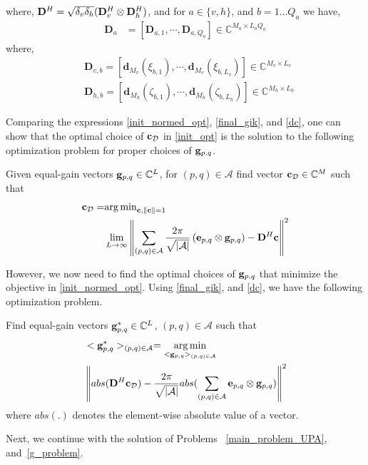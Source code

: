 \noindent where, ${\bf{D}}^H = \sqrt{\delta_v\delta_h}(\mathbf{D}_{v}^{H} \otimes \mathbf{D}_{h}^{H})$, and for $a \in \{v,h\}$, and $b= 1\ldots Q_a$ we have, 
\begin{align}
\mathbf{D}_{a} &=\left[\mathbf{D}_{a, 1}, \cdots, \mathbf{D}_{a, Q_{a}}\right] \in \mathbb{C}^{M_{a} \times L_{a} Q_{a}}
\end{align}
where, 
\begin{align}
    &\mathbf{D}_{v, b} =\left[\mathbf{d}_{M_{v}}\left(\xi_{b,1}\right), \cdots, \mathbf{d}_{M_{v}}\left(\xi_{b, L_v}\right)\right] \in \mathbb{C}^{M_{v} \times L_{v}} \\
    &\mathbf{D}_{h, b} =\left[\mathbf{d}_{M_{h}}\left(\zeta_{b,1}\right), \cdots, \mathbf{d}_{M_{h}}\left(\zeta_{b, L_h}\right)\right] \in \mathbb{C}^{M_{h} \times L_{h}}
\end{align}

Comparing the expressions \eqref{init_normed_opt}, \eqref{final_gik}, and \eqref{dc}, one can show that the optimal choice of ${\bf{c}}_\mathcal{D}$ in \eqref{init_opt} is the solution to the following optimization problem for proper choices of ${\bf{g}}_{p,q}$. 

\begin{problem}
Given equal-gain vectors ${\bf{g}}_{p,q} \in \mathbb{C}^L$, for $(p,q) \in \mathcal{A}$  find vector ${\bf{c}}_{\mathcal{D}} \in \mathbb{C}^{M}$ such that
\begin{align}
{\bf{c}}_{\mathcal{D}}=&{\arg \min }_{{\bf{c}}, \|{\bf{c}}\|=1}\nonumber\\& \lim_{L\rightarrow \infty} \left\|\sum_{(p,q) \in \mathcal{A}}\frac{2\pi}{\sqrt{|\mathcal{A}|}}\left(\mathbf{e}_{p,q} \otimes \mathbf{g}_{p,q}\right)- {\bf{D}}^H {\bf{c}}\right\|^{2} \label{obj_func}
\end{align}
\label{main_problem_UPA}
\end{problem}

However, we now need to find the optimal choices of ${\bf{g}}_{p,q}$ that minimize the objective in \eqref{init_normed_opt}. Using \eqref{final_gik}, and \eqref{dc}, we have the following optimization problem.

\begin{problem}
Find equal-gain vectors ${\bf{g}}^*_{p,q} \in \mathbb{C}^L$, $(p,q) \in \mathcal{A}$ such that
\begin{align}
 &<{\bf{g}}^*_{p,q}>_{(p,q)\in\mathcal{A}} = \underset{<{\bf{g}}_{p,q}>_{(p,q)\in\mathcal{A}}}{\arg\min }\nonumber\\
 &\left\| abs({\bf{D}}^H {\bf{c}}_{\mathcal{D}})- \frac{{2\pi}}{\sqrt{|\mathcal{A}|}} abs(\sum_{(p,q)\in \mathcal{A}}\mathbf{e}_{p,q} \otimes \mathbf{g}_{p,q})\right\|^{2} \label{g_final_eq}
\end{align} 
where $abs(.)$ denotes the element-wise absolute value of a vector.
\label{g_problem}
\end{problem}

Next, we continue with the solution of Problems ~\ref{main_problem_UPA}, and~\ref{g_problem}.

